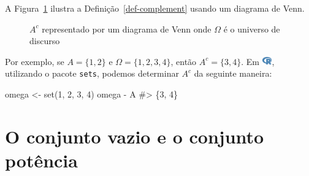 \documentclass[
  letterpaper,
]{book}
\newenvironment{Shaded}{\begin{snugshade}}{\end{snugshade}}
\newcommand{\CommentTok}[1]{\textcolor[rgb]{0.37,0.37,0.37}{#1}}
\newcommand{\DecValTok}[1]{\textcolor[rgb]{0.68,0.00,0.00}{#1}}
\newcommand{\FunctionTok}[1]{\textcolor[rgb]{0.28,0.35,0.67}{#1}}
\newcommand{\NormalTok}[1]{\textcolor[rgb]{0.00,0.23,0.31}{#1}}
\newcommand{\OtherTok}[1]{\textcolor[rgb]{0.00,0.23,0.31}{#1}}
\newcommand{\SpecialCharTok}[1]{\textcolor[rgb]{0.37,0.37,0.37}{#1}}
\theoremstyle{definition}
\theoremstyle{plain}
\theoremstyle{remark}
\begin{document}
A Figura~\ref{fig-complement-venn-diagram} ilustra a
Definição~\ref{def-complement} usando um diagrama de Venn.

\begin{figure}


\caption{\label{fig-complement-venn-diagram}\(A^c\) representado por um
diagrama de Venn onde \(\Omega\) é o universo de discurso}

\end{figure}%

Por exemplo, se \(A = \{ 1, 2 \}\) e \(\Omega = \{ 1, 2, 3, 4 \}\),
então \(A^c = \{ 3, 4 \}\). Em
\includegraphics[width=1.13em,height=1em]{naive_set_theory_files/figure-pdf/fa-icon-9b00320707d42527dde67262afb33ded.pdf},
utilizando o pacote \texttt{sets}, podemos determinar \(A^c\) da
seguinte maneira:

\begin{Shaded}
\begin{Highlighting}[]
\NormalTok{omega }\OtherTok{\textless{}{-}} \FunctionTok{set}\NormalTok{(}\DecValTok{1}\NormalTok{, }\DecValTok{2}\NormalTok{, }\DecValTok{3}\NormalTok{, }\DecValTok{4}\NormalTok{)}
\NormalTok{omega }\SpecialCharTok{{-}}\NormalTok{ A}
\CommentTok{\#\textgreater{} \{3, 4\}}
\end{Highlighting}
\end{Shaded}

\section{O conjunto vazio e o conjunto
potência}\label{o-conjunto-vazio-e-o-conjunto-potuxeancia}
\end{document}
